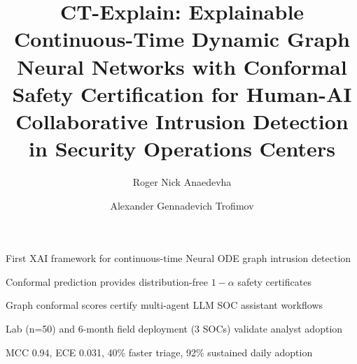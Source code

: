 \documentclass[preprint,review,12pt]{elsarticle}
\begin{document}
\begin{frontmatter}

\title{CT-Explain: Explainable Continuous-Time Dynamic Graph Neural Networks with Conformal Safety Certification for Human-AI Collaborative Intrusion Detection in Security Operations Centers}

\author[mephi]{Roger Nick Anaedevha}
\author[mephi]{Alexander Gennadevich Trofimov}



\begin{highlights}
\item First XAI framework for continuous-time Neural ODE graph intrusion detection
\item Conformal prediction provides distribution-free $1{-}\alpha$ safety certificates
\item Graph conformal scores certify multi-agent LLM SOC assistant workflows
\item Lab (n=50) and 6-month field deployment (3 SOCs) validate analyst adoption
\item MCC 0.94, ECE 0.031, 40\% faster triage, 92\% sustained daily adoption
\end{highlights}


\end{frontmatter}
\end{document}
